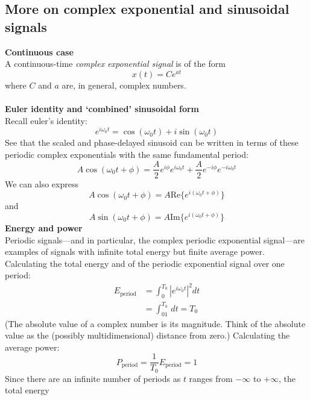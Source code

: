 \documentclass{report}
\begin{document}
\subsection{More on complex exponential and sinusoidal signals}
\textbf{Continuous case}\\
A continuous-time \textit{complex exponential signal} is of the form 
\begin{equation*}
x(t)=Ce^{at}
\end{equation*}
where $C$ and $a$ are, in general, complex numbers.\\
\vspace{1mm}\\
\textbf{Euler identity and `combined' sinusoidal form}\\
Recall euler's identity:
\begin{equation*}
e^{i\omega_0t}=\cos(\omega_0t)+i\sin(\omega_0t)
\end{equation*}
See that the scaled and phase-delayed sinusoid can be written in terms of these periodic complex exponentials
with the same fundamental period:
\begin{equation*}
A\cos(\omega_0t+\phi)=\frac{A}{2}e^{i\phi}e^{i\omega_0t}
+\frac{A}{2}e^{-i\phi}e^{-i\omega_0t}
\end{equation*}
We can also express
\begin{equation*}
A\cos(\omega_0t+\phi)=A\text{Re}\{e^{i(\omega_0t+\phi)}\}
\end{equation*}
and
\begin{equation*}
A\sin(\omega_0t+\phi)=A\text{Im}\{e^{i(\omega_0t+\phi)}\}
\end{equation*}
\textbf{Energy and power}\\
Periodic signals---and in particular, the complex periodic exponential signal---are examples of signals
with infinite total energy but finite average power. 
Calculating the total energy and of the periodic exponential signal over one period:
\begin{align*}
E_{\text{period}}&=\int^{T_0}_0|e^{i\omega_0t}|^2dt\\
&=\int^{T_0}_01\,dt=T_0
\end{align*}
(The absolute value of a complex number is its magnitude. Think of the absolute value as the 
(possibly multidimensional) distance from zero.) Calculating the average power:
\begin{equation*}
P_{\text{period}}=\frac{1}{T_0}E_{\text{period}}=1
\end{equation*}
Since there are an infinite number of periods as $t$ ranges from $-\infty$ to $+\infty$, the total energy 
\end{document}

